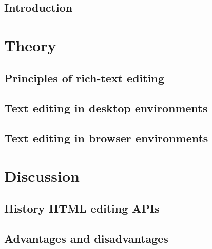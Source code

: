 \chapter{Introduction}



\part{Theory}
\label{part:theory}

\chapter{Principles of rich-text editing}



\chapter{Text editing in desktop environments}
\label{ch:desktop}



\chapter{Text editing in browser environments}
\label{ch:browser}






\part{Discussion}
\label{part:discussion}



\chapter{History HTML editing APIs}
\label{ch:editing_apis_history}






\chapter{Advantages and disadvantages}





